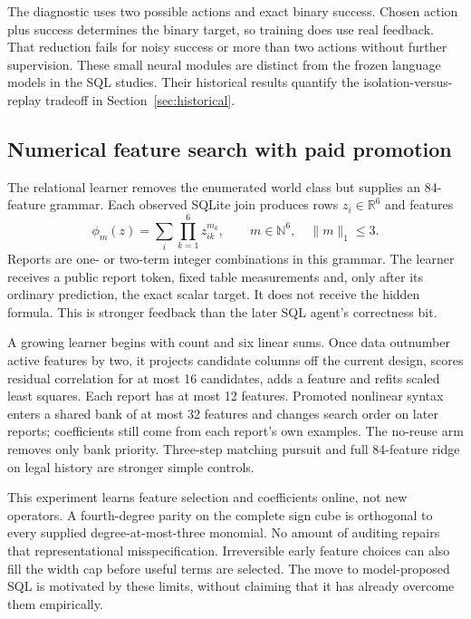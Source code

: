 \documentclass[10pt,twocolumn]{article}
\begin{document}
The diagnostic uses two possible actions and exact binary success. Chosen
action plus success determines the binary target, so training does use real
feedback. That reduction fails for noisy success or more than two actions
without further supervision. These small neural modules are distinct from the
frozen language models in the SQL studies. Their historical results quantify
the isolation-versus-replay tradeoff in Section~\ref{sec:historical}.

\subsection{Numerical feature search with paid promotion}
The relational learner removes the enumerated world class but supplies an
84-feature grammar. Each observed SQLite join produces rows
$z_i\in\mathbb R^6$ and features
\begin{equation}
 \phi_m(z)=\sum_i\prod_{k=1}^6 z_{ik}^{m_k},\qquad
 m\in\mathbb N^6,\quad\|m\|_1\leq3.
\end{equation}
Reports are one- or two-term integer combinations in this grammar. The learner
receives a public report token, fixed table measurements and, only after its
ordinary prediction, the exact scalar target. It does not receive the hidden
formula. This is stronger feedback than the later SQL agent's correctness bit.

A growing learner begins with count and six linear sums. Once data outnumber
active features by two, it projects candidate columns off the current design,
scores residual correlation for at most 16 candidates, adds a feature and refits
scaled least squares. Each report has at most 12 features. Promoted nonlinear
syntax enters a shared bank of at most 32 features and changes search order on
later reports; coefficients still come from each report's own examples.
The no-reuse arm removes only bank priority. Three-step matching pursuit and
full 84-feature ridge on legal history are stronger simple controls.

This experiment learns feature selection and coefficients online, not new
operators. A fourth-degree parity on the complete sign cube is orthogonal to
every supplied degree-at-most-three monomial. No amount of auditing repairs
that representational misspecification. Irreversible early feature choices can
also fill the width cap before useful terms are selected. The move to
model-proposed SQL is motivated by these limits, without claiming that it has
already overcome them empirically.
\end{document}
